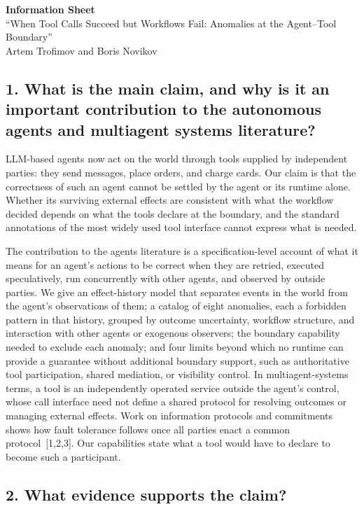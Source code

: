 \documentclass[11pt,a4paper]{article}
\begin{document}
\begin{center}
{\large\textbf{Information Sheet}}\\[3pt]
``When Tool Calls Succeed but Workflows Fail: Anomalies at the
Agent--Tool Boundary''\\
Artem Trofimov and Boris Novikov
\end{center}

\subsection*{1. What is the main claim, and why is it an important
contribution to the autonomous agents and multiagent systems literature?}

LLM-based agents now act on the world through tools supplied by
independent parties: they send messages, place orders, and charge cards.
Our claim is that the correctness of such an agent cannot be settled by
the agent or its runtime alone. Whether its surviving external effects are
consistent with what the workflow decided depends on what the tools
declare at the boundary, and the standard annotations of the most widely
used tool interface cannot express what is needed.

The contribution to the agents literature is a specification-level
account of what it means for an agent's actions to be correct when they
are retried, executed speculatively, run concurrently with other agents,
and observed by outside parties. We give an effect-history model that
separates events in the world from the agent's observations of them; a
catalog of eight anomalies, each a forbidden pattern in that history,
grouped by outcome uncertainty, workflow structure, and interaction with
other agents or exogenous observers; the boundary capability needed to
exclude each anomaly; and four limits beyond which no runtime can provide
a guarantee
without additional boundary support, such as authoritative tool
participation, shared mediation, or visibility control. In multiagent-systems terms,
a tool is an independently operated service outside the agent's control,
whose call interface need not define a shared protocol for resolving
outcomes or managing external effects. Work on information protocols and
commitments shows how fault tolerance follows once all parties enact a
common protocol~[1,2,3]. Our capabilities state what a tool would have to
declare to become such a participant.

\subsection*{2. What evidence supports the claim?}
\end{document}
